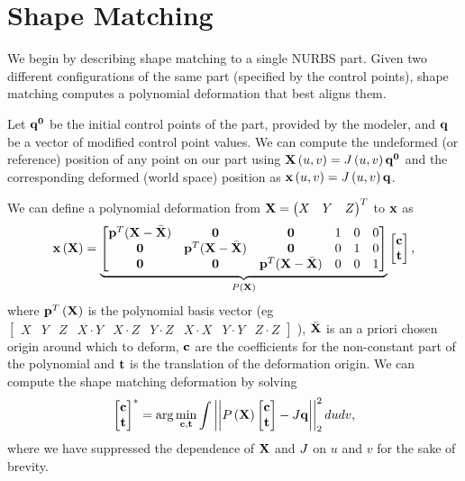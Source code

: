 \section{Shape Matching}
\label{sec:shapematching}

We begin by describing shape matching to a single NURBS part. 
Given two different configurations of the same part (specified by the control points), shape matching computes a polynomial deformation that best aligns them.

Let $\mathbf{q^0}$ be the initial control points of the part, provided by the modeler, and $\mathbf{q}$ be a vector of modified control point values.
We can compute the undeformed (or reference) position of any point on our part using $\mathbf{X}\left(u,v\right) = J\left(u,v\right)\mathbf{q^0}$ and the corresponding
deformed (world space) position as $\mathbf{x}\left(u,v\right) = J\left(u,v\right)\mathbf{q}$.

We can define a polynomial deformation from $\mathbf{X} = \begin{pmatrix} X & Y & Z \end{pmatrix}^T$ to $\mathbf{x}$  as 
\begin{equation}
    \mathbf{x}\left(\mathbf{X}\right) = 
    \underbrace{\begin{bmatrix}
    \mathbf{p}^T(\mathbf{X}-\bar{\mathbf{X}}) & \mathbf{0} & \mathbf{0} & 1 & 0 & 0\\
    \mathbf{0} & \mathbf{p}^T(\mathbf{X}-\bar{\mathbf{X}}) & \mathbf{0} & 0 & 1 & 0\\
    \mathbf{0} & \mathbf{0} & \mathbf{p}^T(\mathbf{X}-\bar{\mathbf{X}}) & 0 & 0 & 1\\
    \end{bmatrix}}_{P\left(\mathbf{X}\right)}
    \begin{bmatrix} \mathbf{c}\\ \mathbf{t} \end{bmatrix},
    \label{eq:projection}
\end{equation} where $\mathbf{p}^T\left(\mathbf{X}\right)$ is the polynomial basis vector \newline (eg $\begin{bmatrix} X & Y & Z & X\cdot Y & X\cdot Z & Y\cdot Z& X\cdot X & Y\cdot Y & Z\cdot Z \end{bmatrix}$ ),
$\bar{\mathbf{X}}$ is an a priori chosen origin around which to deform, $\mathbf{c}$ are the coefficients for the 
non-constant part of the polynomial and $\mathbf{t}$ is the translation of the deformation origin. 
We can compute the shape matching deformation by solving~\cite{10.1145/1073204.1073216}
\begin{equation}
   \begin{bmatrix} \mathbf{c}\\ \mathbf{t} \end{bmatrix}^* = \arg\min_{\mathbf{c},\mathbf{t}} \int \left\lvert\left\lvert P\left(\mathbf{X}\right)\begin{bmatrix} \mathbf{c}\\ \mathbf{t} \end{bmatrix} - J\mathbf{q}\right\rvert\right\rvert^2_2 dudv,
\end{equation} where we have suppressed the dependence of $\mathbf{X}$ and $J$ on $u$ and $v$ for the sake of brevity.

